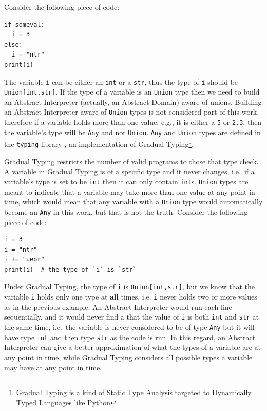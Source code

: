 \documentclass[
11pt, %
english, %
singlespacing, %
headsepline, %
]{MastersDoctoralThesis} %
\begin{document}
Consider the following piece of code:

\begin{verbatim}
if someval:
  i = 3
else:
  i = "ntr"
print(i)
\end{verbatim}

The variable \texttt{i} can be either an \texttt{int} or a \texttt{str},
thus the type of \texttt{i} should be \texttt{Union{[}int,str{]}}. If
the type of a variable is an \texttt{Union} type then we need to build
an Abstract Interpreter (actually, an Abstract Domain) aware of unions.
Building an Abstract Interpreter aware of \texttt{Union} types is not
considered part of this work, therefore if a variable holds more than
one value, e.g., it is either a \texttt{5} or \texttt{2.3}, then the
variable's type will be \texttt{Any} and not \texttt{Union}.
\texttt{Any} and \texttt{Union} types are defined in the \texttt{typing}
library \autocite{pep484}, an implementation of Gradual Typing\footnote{Gradual
  Typing is a kind of Static Type Analysis targeted to Dynamically Typed
  Languages like Python}.

Gradual Typing restricts the number of valid programs to those that type
check. A variable in Gradual Typing is of a specific type and it never
changes, i.e.~if a variable's type is set to be \texttt{int} then it can
only contain \texttt{int}s. \texttt{Union} types are meant to indicate
that a variable may take more than one value at any point in time, which
would mean that any variable with a \texttt{Union} type would
automatically become an \texttt{Any} in this work, but that is not the
truth. Consider the following piece of code:

\begin{verbatim}
i = 3
i = "ntr"
i += "ueor"
print(i)  # the type of `i` is `str`
\end{verbatim}

Under Gradual Typing, the type of \texttt{i} is
\texttt{Union{[}int,str{]}}, but we know that the variable \texttt{i}
holds only one type at \textbf{all} times, i.e. \texttt{i} never holds
two or more values as in the previous example. An Abstract Interpreter
would run each line sequentially, and it would never find a that the
value of \texttt{i} is both \texttt{int} and \texttt{str} at the same
time, i.e.~the variable is never considered to be of type \texttt{Any}
but it will have type \texttt{int} and then type \texttt{str} as the
code is run. In this regard, an Abstract Interpreter can give a better
approximation of what the types of a variable are at any point in time,
while Gradual Typing considers all possible types a variable may have at
any point in time.
\end{document}
